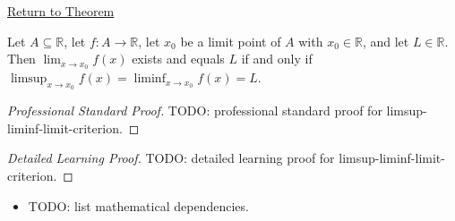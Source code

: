 \newpage
{}
\label{prf:limsup-liminf-limit-criterion}

\begin{remark*}[Return]
\hyperref[prop:limsup-liminf-limit-criterion]{Return to Theorem}
\end{remark*}

\begin{proposition*}[Limit Exists iff $=$]
Let $A \subseteq \mathbb{R}$, let $f \colon A \to \mathbb{R}$, let $x_0$ be a limit point of $A$ with $x_0 \in \mathbb{R}$, and let $L \in \mathbb{R}$. Then $\lim_{x \to x_0} f(x)$ exists and equals $L$ if and only if $\limsup_{x \to x_0} f(x) = \liminf_{x \to x_0} f(x) = L$.
\end{proposition*}

\begin{proof}[Professional Standard Proof]
\LRAProofBodyStart
TODO: professional standard proof for limsup-liminf-limit-criterion.
\end{proof}

\begin{proof}[Detailed Learning Proof]
\LRAProofBodyStart
TODO: detailed learning proof for limsup-liminf-limit-criterion.
\end{proof}

\begin{remark*}
\end{remark*}

\begin{dependencies}
\begin{itemize}
  \item TODO: list mathematical dependencies.
\end{itemize}
\end{dependencies}

\clearpage
